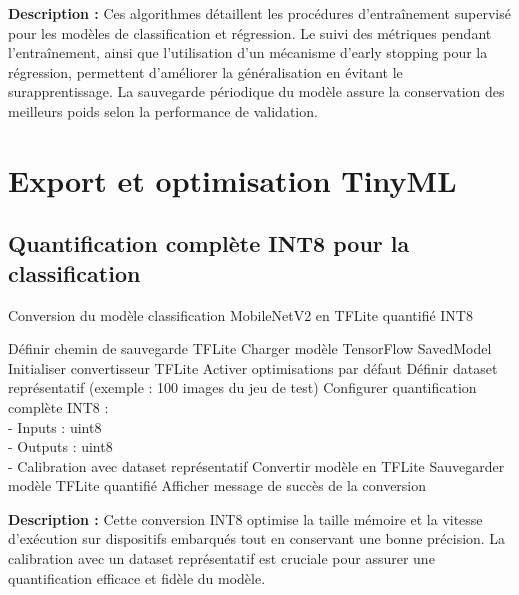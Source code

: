\vspace{8pt}

\noindent\textbf{Description :} Ces algorithmes détaillent les procédures d'entraînement supervisé pour les modèles de classification et régression. Le suivi des métriques pendant l'entraînement, ainsi que l'utilisation d'un mécanisme d'early stopping pour la régression, permettent d'améliorer la généralisation en évitant le surapprentissage. La sauvegarde périodique du modèle assure la conservation des meilleurs poids selon la performance de validation.

\section*{Export et optimisation TinyML}

\subsection*{Quantification complète INT8 pour la classification}


\begin{algorithm}[H]
\caption{Conversion du modèle classification MobileNetV2 en TFLite quantifié INT8}

Définir chemin de sauvegarde TFLite\;
Charger modèle TensorFlow SavedModel\;
Initialiser convertisseur TFLite\;
Activer optimisations par défaut\;
Définir dataset représentatif (exemple : 100 images du jeu de test)\;
Configurer quantification complète INT8 : \\
\hspace{5mm} - Inputs : uint8 \\
\hspace{5mm} - Outputs : uint8 \\
\hspace{5mm} - Calibration avec dataset représentatif\;
Convertir modèle en TFLite\;
Sauvegarder modèle TFLite quantifié\;
Afficher message de succès de la conversion\;
\end{algorithm}

\vspace{5mm}

\noindent\textbf{Description :} Cette conversion INT8 optimise la taille mémoire et la vitesse d'exécution sur dispositifs embarqués tout en conservant une bonne précision. La calibration avec un dataset représentatif est cruciale pour assurer une quantification efficace et fidèle du modèle.

